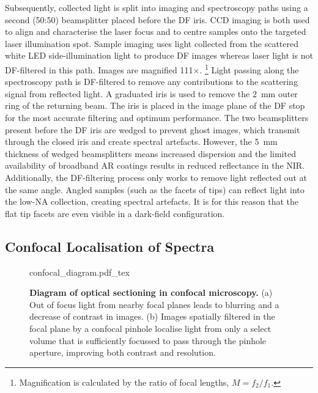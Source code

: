 \documentclass{article}
\begin{document}
Subsequently, collected light is split into imaging and spectroscopy paths using a second (50:50) beamsplitter placed before the DF iris. CCD imaging is both used to align and characterise the laser focus and to centre samples onto the targeted laser illumination spot. Sample imaging uses light collected from the scattered white LED side-illumination light to produce DF images whereas laser light is not DF-filtered in this path. Images are magnified 111$\times$.%
\footnote{Magnification is calculated by the ratio of focal lengths, $M=f_2/f_1$.}
Light passing along the spectroscopy path is DF-filtered to remove any contributions to the scattering signal from reflected light. A graduated iris is used to remove the \SI{2}{mm} outer ring of the returning beam. The iris is placed in the image plane of the DF stop for the most accurate filtering and optimum performance. The two beamsplitters present before the DF iris are wedged to prevent ghost images, which transmit through the closed iris and create spectral artefacts. However, the \SI{5}{mm} thickness of wedged beamsplitters means increased dispersion and the limited availability of broadband AR coatings results in reduced reflectance in the NIR. %
Additionally, the DF-filtering process only works to remove light reflected out at the same angle. Angled samples (such as the facets of tips) can reflect light into the low-NA collection, creating spectral artefacts. It is for this reason that the flat tip facets are even visible in a dark-field configuration.

\subsection{Confocal Localisation of Spectra}

\begin{figure}[bt]
\centering
\fontsize{10pt}{1em}\selectfont
{confocal_diagram.pdf_tex}
\caption[Diagram of optical sectioning in confocal microscopy]{\textbf{Diagram of optical sectioning in confocal microscopy.} (a) Out of focus light from nearby focal planes leads to blurring and a decrease of contrast in images. (b) Images spatially filtered in the focal plane by a confocal pinhole localise light from only a select volume that is sufficiently focussed to pass through the pinhole aperture, improving both contrast and resolution.}
\label{fig:confocal_diagram}
\end{figure}
\end{document}
